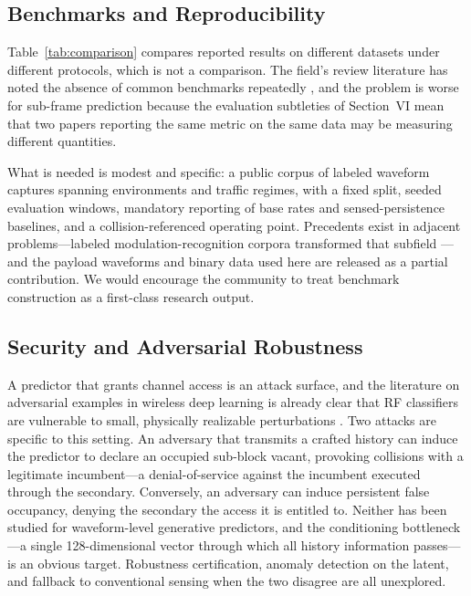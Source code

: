 \documentclass[lettersize,journal]{IEEEtran}
\begin{document}
\subsection{Benchmarks and Reproducibility}
Table~\ref{tab:comparison} compares reported results on different
datasets under different protocols, which is not a comparison. The
field's review literature has noted the absence of common benchmarks
repeatedly \cite{Suriya2022,Wu2017,Tidjani2019,Eltom2018}, and the
problem is worse for sub-frame prediction because the evaluation
subtleties of Section~VI mean that two papers reporting the same metric
on the same data may be measuring different quantities.

What is needed is modest and specific: a public corpus of labeled
waveform captures spanning environments and traffic regimes, with a
fixed split, seeded evaluation windows, mandatory reporting of base
rates and sensed-persistence baselines, and a collision-referenced
operating point. Precedents exist in adjacent problems---labeled
modulation-recognition corpora transformed that subfield
\cite{OShea2018}---and the payload waveforms and binary data used here
are released \cite{PayloadData} as a partial contribution. We would
encourage the community to treat benchmark construction as a
first-class research output.

\subsection{Security and Adversarial Robustness}
A predictor that grants channel access is an attack surface, and the
literature on adversarial examples in wireless deep learning is already
clear that RF classifiers are vulnerable to small, physically realizable
perturbations \cite{Sadeghi2019}. Two attacks are specific to this
setting. An adversary that transmits a crafted history can induce the
predictor to declare an occupied sub-block vacant, provoking collisions
with a legitimate incumbent---a denial-of-service against the incumbent
executed through the secondary. Conversely, an adversary can induce
persistent false occupancy, denying the secondary the access it is
entitled to. Neither has been studied for waveform-level generative
predictors, and the conditioning bottleneck---a single 128-dimensional
vector through which all history information passes---is an obvious
target. Robustness certification, anomaly detection on the latent, and
fallback to conventional sensing when the two disagree are all
unexplored.
\end{document}
